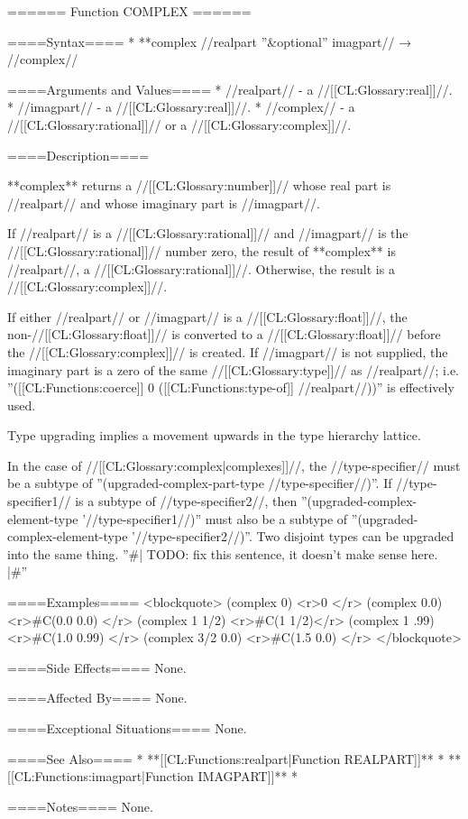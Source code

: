 ====== Function COMPLEX ======

====Syntax====
  * **complex //realpart ''&optional'' imagpart// → //complex//

====Arguments and Values====
  * //realpart// - a //[[CL:Glossary:real]]//.
  * //imagpart// - a //[[CL:Glossary:real]]//.
  * //complex// - a //[[CL:Glossary:rational]]// or a //[[CL:Glossary:complex]]//.

====Description====

**complex** returns a //[[CL:Glossary:number]]// whose real part is //realpart// and whose imaginary part is //imagpart//.

If //realpart// is a //[[CL:Glossary:rational]]// and //imagpart// is the //[[CL:Glossary:rational]]// number zero, the result of **complex** is //realpart//, a //[[CL:Glossary:rational]]//. Otherwise, the result is a //[[CL:Glossary:complex]]//.

If either //realpart// or //imagpart// is a //[[CL:Glossary:float]]//, the non-//[[CL:Glossary:float]]// is converted to a //[[CL:Glossary:float]]// before the //[[CL:Glossary:complex]]// is created. If //imagpart// is not supplied, the imaginary part is a zero of the same //[[CL:Glossary:type]]// as //realpart//; i.e. ''([[CL:Functions:coerce]] 0 ([[CL:Functions:type-of]] //realpart//))'' is effectively used.

Type upgrading implies a movement upwards in the type hierarchy lattice.

In the case of //[[CL:Glossary:complex|complexes]]//, the //type-specifier//  must be a subtype of ''(upgraded-complex-part-type //type-specifier//)''. If //type-specifier1// is a subtype of //type-specifier2//, then ''(upgraded-complex-element-type '//type-specifier1//)'' must also be a subtype of ''(upgraded-complex-element-type '//type-specifier2//)''. Two disjoint types can be upgraded into the same thing. ''#| TODO: fix this sentence, it doesn't make sense here. |#'' 

====Examples====
<blockquote> 
(complex 0) <r>0 </r>
(complex 0.0) <r>#C(0.0 0.0) </r>
(complex 1 1/2) <r>#C(1 1/2)</r>
(complex 1 .99) <r>#C(1.0 0.99) </r>
(complex 3/2 0.0) <r>#C(1.5 0.0) </r>
</blockquote>

====Side Effects====
None.

====Affected By====
None.

====Exceptional Situations====
None.

====See Also====
  * **[[CL:Functions:realpart|Function REALPART]]**
  * **[[CL:Functions:imagpart|Function IMAGPART]]**
  * {\secref\SharpsignC}

====Notes====
None.

